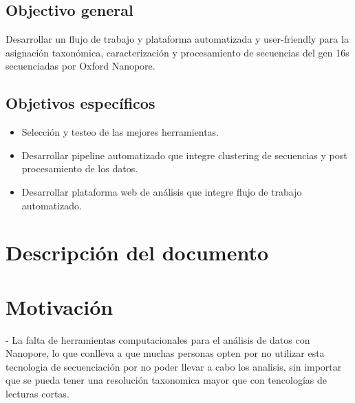 \subsection{Objectivo general}
Desarrollar un flujo de trabajo y plataforma automatizada y user-friendly para la asignación taxonómica, caracterización y procesamiento de secuencias del gen 16s secuenciadas por Oxford Nanopore.
\subsection{Objetivos específicos}
\begin{itemize}
    \item Selección y testeo de las mejores herramientas.
    \item Desarrollar pipeline automatizado que integre clustering de secuencias y post procesamiento de los datos.
    \item Desarrollar plataforma web de análisis que integre flujo de trabajo automatizado.
\end{itemize}
\section{Descripción del documento}
\section{Motivación}
 
- La falta de herramientas computacionales para el análisis de datos con Nanopore, lo que conlleva a que muchas personas opten por no utilizar esta tecnologia de secuenciación por no poder llevar a cabo los analisis, sin importar que se pueda tener una resolución taxonomica mayor que con tencologías de lecturas cortas.
